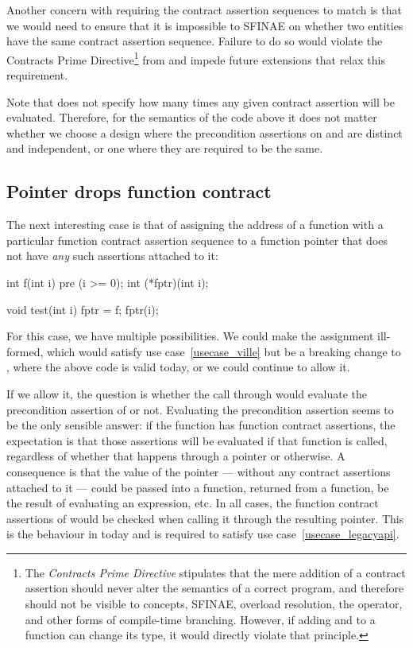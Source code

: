 Another concern with requiring the contract assertion sequences to match is that we would need to ensure that it is impossible to SFINAE on whether two entities have the same contract assertion sequence. Failure to do so would violate the Contracts Prime Directive\footnote{The \emph{Contracts Prime Directive} stipulates that the mere addition of a contract assertion should never alter the semantics of a correct program, and therefore should not be visible to concepts, SFINAE, overload resolution, the  operator, and other forms of compile-time branching. However, if adding  and  to a function can change its type, it would directly violate that principle.} from \cite{P2900R9} and impede future extensions that relax this requirement.

Note that \cite{P2900R9} does not specify how many times any given contract assertion will be evaluated. Therefore, for the semantics of the code above it does not matter whether we choose a design where the precondition assertions on  and  are distinct and independent, or one where they are required to be the same.


\subsection{Pointer drops function contract}
\label{dropping}

The next interesting case is that of assigning the address of a function with a particular function contract assertion sequence to a function pointer that does not have \emph{any} such assertions attached to it:
\begin{codeblock}
int f(int i) pre (i >= 0);
int (*fptr)(int i);

void test(int i) {
  fptr = f; 
  fptr(i); 
}
\end{codeblock}
For this case, we have multiple possibilities. We could make the assignment ill-formed, which would satisfy use case~\ref{usecase_ville} but be a breaking change to \cite{P2900R9}, where the above code is valid today, or we could continue to allow it.

If we allow it, the question is whether the call through  would evaluate the precondition assertion of  or not. Evaluating the precondition assertion seems to be the only sensible answer: if the function  has function contract assertions, the expectation is that those assertions will be evaluated if that function is called, regardless of whether that happens through a pointer or otherwise. A consequence is that the value of the pointer  --- without any contract assertions attached to it --- could be passed into a function, returned from a function, be the result of evaluating an expression, etc. In all cases, the function contract assertions of  would be checked when calling it through the resulting pointer. This is the behaviour in \cite{P2900R9} today and is required to satisfy use case~\ref{usecase_legacyapi}.

